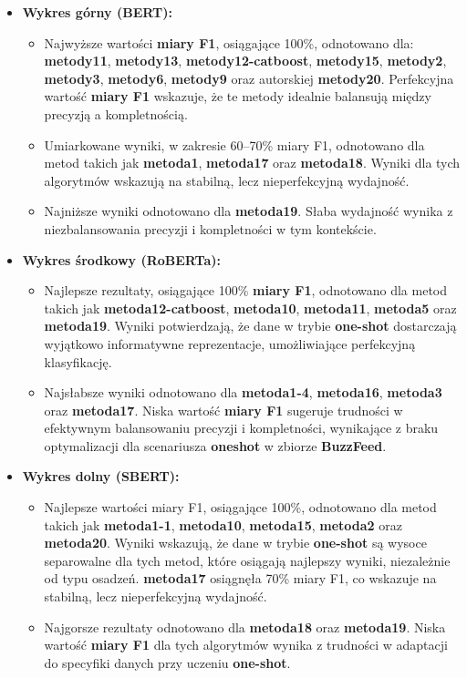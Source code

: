 \begin{itemize}
	\item \textbf{Wykres górny (BERT):}
	      \begin{itemize}
		      \item Najwyższe wartości \textbf{miary F1}, osiągające 100\%, odnotowano dla: \textbf{metody11}, \textbf{metody13}, \textbf{metody12-catboost}, \textbf{metody15}, \textbf{metody2}, \textbf{metody3}, \textbf{metody6}, \textbf{metody9} oraz autorskiej \textbf{metody20}. Perfekcyjna wartość \textbf{miary F1} wskazuje, że te metody idealnie balansują między precyzją a kompletnością.
		      \item Umiarkowane wyniki, w zakresie 60--70\% miary F1, odnotowano dla metod takich jak \textbf{metoda1}, \textbf{metoda17} oraz \textbf{metoda18}. Wyniki dla tych algorytmów wskazują na stabilną, lecz nieperfekcyjną wydajność.
		      \item Najniższe wyniki odnotowano dla \textbf{metoda19}. Słaba wydajność wynika z niezbalansowania precyzji i kompletności w tym kontekście.
	      \end{itemize}

	\item \textbf{Wykres środkowy (RoBERTa):}
	      \begin{itemize}
		      \item Najlepsze rezultaty, osiągające 100\% \textbf{miary F1}, odnotowano dla metod takich jak \textbf{metoda12-catboost}, \textbf{metoda10}, \textbf{metoda11}, \textbf{metoda5} oraz \textbf{metoda19}. Wyniki potwierdzają, że dane w trybie \textbf{one-shot} dostarczają wyjątkowo informatywne reprezentacje, umożliwiające perfekcyjną klasyfikację.
		      \item Najsłabsze wyniki odnotowano dla \textbf{metoda1-4}, \textbf{metoda16}, \textbf{metoda3} oraz \textbf{metoda17}. Niska wartość \textbf{miary F1} sugeruje trudności w efektywnym balansowaniu precyzji i kompletności, wynikające z braku optymalizacji dla scenariusza \textbf{one\-shot} w zbiorze \textbf{BuzzFeed}.
	      \end{itemize}

	\item \textbf{Wykres dolny (SBERT):}
	      \begin{itemize}
		      \item Najlepsze wartości miary F1, osiągające 100\%, odnotowano dla metod takich jak \textbf{metoda1-1}, \textbf{metoda10}, \textbf{metoda15}, \textbf{metoda2} oraz \textbf{metoda20}. Wyniki wskazują, że dane w trybie \textbf{one-shot} są wysoce separowalne dla tych metod, które osiągają najlepszy wyniki, niezależnie od typu osadzeń. \textbf{metoda17} osiągnęła 70\% miary F1, co wskazuje na stabilną, lecz nieperfekcyjną wydajność.
		      \item Najgorsze rezultaty odnotowano dla \textbf{metoda18} oraz \textbf{metoda19}. Niska wartość \textbf{miary F1} dla tych algorytmów wynika z trudności w adaptacji do specyfiki danych przy uczeniu \textbf{one-shot}.
	      \end{itemize}
\end{itemize}

